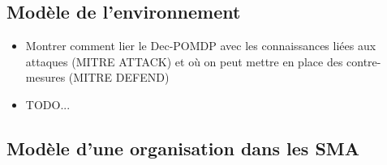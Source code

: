 \documentclass[runningheads]{llncs}
\begin{document}
\subsection{Modèle de l'environnement}
\begin{itemize}

    \item Montrer comment lier le Dec-POMDP avec les connaissances liées aux attaques (MITRE ATTACK) et où on peut mettre en place des contre-mesures (MITRE DEFEND)
    \item TODO...
\end{itemize}

\subsection{Modèle d'une organisation dans les SMA}
\end{document}
